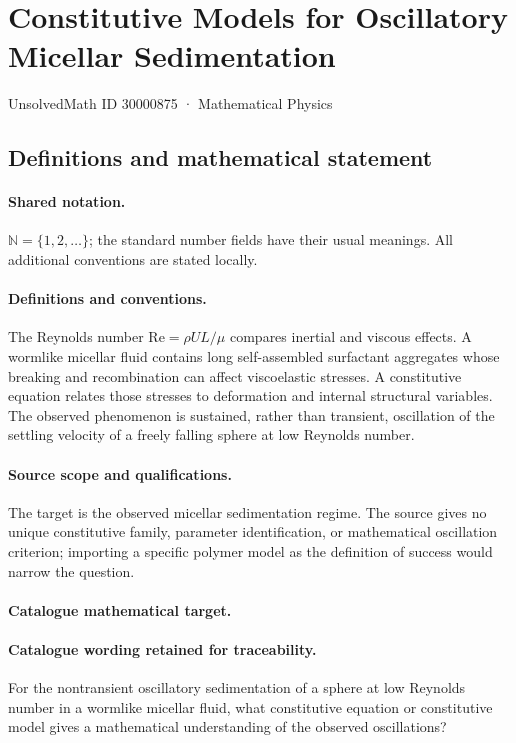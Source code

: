\documentclass[11pt]{article}
\begin{document}
\setcounter{section}{30000874}
\section{Constitutive Models for Oscillatory Micellar Sedimentation}\label{30000875}
{\small UnsolvedMath ID 30000875 · Mathematical Physics}
\subsection{Definitions and mathematical statement}

\paragraph{Shared notation.}$\mathbb N=\{1,2,\ldots\}$; the standard number fields have their usual meanings. All additional conventions are stated locally.


\paragraph{Definitions and conventions.} The Reynolds number $\mathrm{Re}=\rho UL/\mu$ compares inertial and viscous effects. A wormlike micellar fluid contains long self-assembled surfactant aggregates whose breaking and recombination can affect viscoelastic stresses. A constitutive equation relates those stresses to deformation and internal structural variables. The observed phenomenon is sustained, rather than transient, oscillation of the settling velocity of a freely falling sphere at low Reynolds number.

\paragraph{Source scope and qualifications.} The target is the observed micellar sedimentation regime. The source gives no unique constitutive family, parameter identification, or mathematical oscillation criterion; importing a specific polymer model as the definition of success would narrow the question.

\paragraph{Catalogue mathematical target.}
\paragraph{Catalogue wording retained for traceability.}
For the nontransient oscillatory sedimentation of a sphere at low Reynolds number in a wormlike micellar fluid, what constitutive equation or constitutive model gives a mathematical understanding of the observed oscillations?
\end{document}
